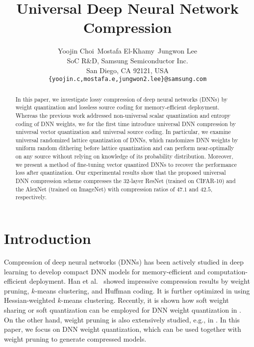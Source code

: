 \documentclass{article}
\title{Universal Deep Neural Network Compression}
\author{
  Yoojin Choi\qquad~Mostafa El-Khamy\qquad~Jungwon Lee\\
  SoC R\&D, Samsung Semiconductor Inc.\\
  San Diego, CA 92121, USA\\
  \texttt{\{yoojin.c,mostafa.e,jungwon2.lee\}@samsung.com} \\
}
\theoremstyle{remark}
\begin{document}

\maketitle

\begin{abstract}
In this paper, we investigate lossy compression of deep neural networks (DNNs) by weight quantization and lossless source coding for memory-efficient deployment. Whereas the previous work addressed non-universal scalar quantization and entropy coding of DNN weights, we for the first time introduce universal DNN compression by universal vector quantization and universal source coding. In particular, we examine universal randomized lattice quantization of DNNs, which randomizes DNN weights by uniform random dithering before lattice quantization and can perform near-optimally on any source without relying on knowledge of its probability distribution. Moreover, we present a method of fine-tuning vector quantized DNNs to recover the performance loss after quantization. Our experimental results show that the proposed universal DNN compression scheme compresses the 32-layer ResNet (trained on CIFAR-10) and the AlexNet (trained on ImageNet) with compression ratios of $47.1$ and $42.5$, respectively.%
\end{abstract}

\section{Introduction} \label{sec:intro}

Compression of deep neural networks (DNNs) has been actively studied in deep learning to develop compact DNN models for memory-efficient and computation-efficient deployment. Han et al.~\cite{han2015deep} showed impressive compression results by weight pruning, $k$-means clustering, and Huffman coding. It is further optimized in \cite{choi2016towards} using Hessian-weighted $k$-means clustering. Recently, it is shown how soft weight sharing or soft quantization can be employed for DNN weight quantization in \cite{ullrich2017soft,agustsson2017soft}. On the other hand, weight pruning is also extensively studied, e.g., in \cite{guo2016dynamic,molchanov2017variational,louizos2017bayesian,lin2017runtime,dai2018compressing}. In this paper, we focus on DNN weight quantization, which can be used together with weight pruning to generate compressed models. 
\end{document}

